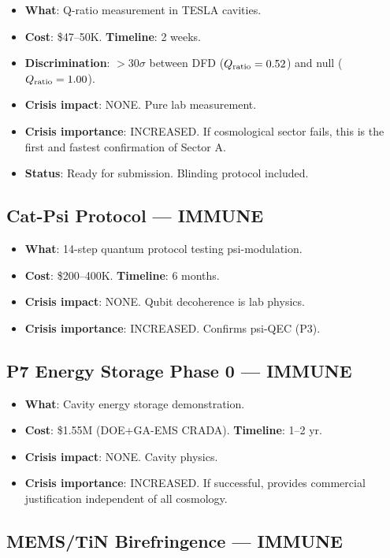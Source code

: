 \documentclass[11pt]{article}
\begin{document}
\begin{itemize}
\item \textbf{What}: Q-ratio measurement in TESLA cavities.
\item \textbf{Cost}: \$47--50K. \textbf{Timeline}: 2 weeks.
\item \textbf{Discrimination}: $>30\sigma$ between DFD ($Q_{\rm ratio} =
  0.52$) and null ($Q_{\rm ratio} = 1.00$).
\item \textbf{Crisis impact}: NONE. Pure lab measurement.
\item \textbf{Crisis importance}: INCREASED. If cosmological sector fails,
  this is the first and fastest confirmation of Sector A.
\item \textbf{Status}: Ready for submission. Blinding protocol included.
\end{itemize}

\subsection{Cat-Psi Protocol --- IMMUNE}

\begin{itemize}
\item \textbf{What}: 14-step quantum protocol testing psi-modulation.
\item \textbf{Cost}: \$200--400K. \textbf{Timeline}: 6 months.
\item \textbf{Crisis impact}: NONE. Qubit decoherence is lab physics.
\item \textbf{Crisis importance}: INCREASED. Confirms psi-QEC (P3).
\end{itemize}

\subsection{P7 Energy Storage Phase 0 --- IMMUNE}

\begin{itemize}
\item \textbf{What}: Cavity energy storage demonstration.
\item \textbf{Cost}: \$1.55M (DOE+GA-EMS CRADA). \textbf{Timeline}: 1--2 yr.
\item \textbf{Crisis impact}: NONE. Cavity physics.
\item \textbf{Crisis importance}: INCREASED. If successful, provides
  commercial justification independent of all cosmology.
\end{itemize}

\subsection{MEMS/TiN Birefringence --- IMMUNE}
\end{document}

